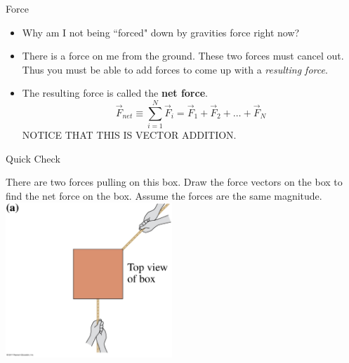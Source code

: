 \documentclass{beamer}
\begin{document}
\begin{frame}{Force}
\begin{itemize}
   \item Why am I not being ``forced" down by gravities force right now?
   \item<2> There is a force on me from the ground. These two forces must cancel out. Thus you must be able to add forces to come up with a {\it resulting force}.
   \item<3> The resulting force is called the {\bf net force}.
   \begin{equation*}
      \vec{F}_{net} \equiv \sum\limits_{i=1}^N \vec{F}_i = \vec{F}_1 + \vec{F}_2 + \ldots + \vec{F}_N
   \end{equation*}
   NOTICE THAT THIS IS VECTOR ADDITION.
\end{itemize}
\end{frame}

\begin{frame}{Quick Check}
\begin{center}
   There are two forces pulling on this box. Draw the force vectors on the box to find the net force on the box. Assume the forces are the same magnitude.\\
   \includegraphics[width=0.47\textwidth]{../figures/05_02_FigureA.jpg}
   ~~
\end{center}
\end{frame}
\end{document}
